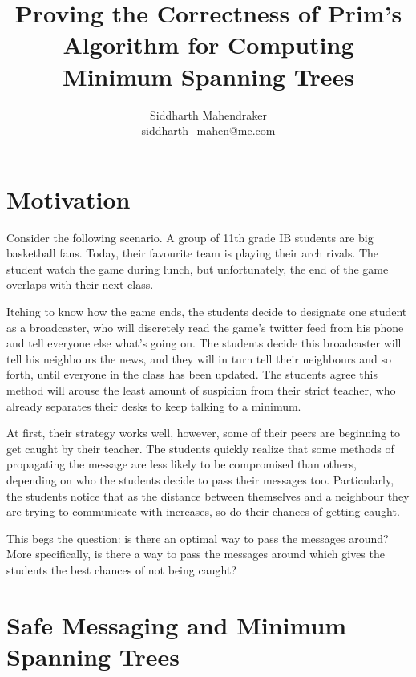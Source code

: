 \documentclass[a4paper,11pt]{report}
\theoremstyle{plain}
\theoremstyle{definition}
\begin{document}
\title{Proving the Correctness of Prim's Algorithm for Computing
Minimum Spanning Trees}
\author{Siddharth Mahendraker\\
    \url{siddharth\_mahen@me.com}}
\maketitle

\setcounter{page}{1}
\tableofcontents
\clearpage
\setcounter{page}{1}


\section{Motivation}

Consider the following scenario. A group of 11th grade IB students are big
basketball fans. Today, their favourite team is playing their arch rivals.
The student watch the game during lunch, but unfortunately, the end of the
game overlaps with their next class.

Itching to know how the game ends, the students decide to designate one
student as a broadcaster, who will discretely read the game's twitter
feed from his phone and tell everyone else what's going on. The students decide
this broadcaster will tell his neighbours the news, and they will in turn tell
their neighbours and so forth, until everyone in the class has been updated.
The students agree this method will arouse the least amount of suspicion from
their strict teacher, who already separates their desks to keep talking to
a minimum.

At first, their strategy works well, however, some of their peers are beginning
to get caught by their teacher. The students quickly realize
that some methods of propagating the message are less likely to be
compromised than others, depending on who the students decide to pass
their messages too. Particularly, the students notice that as the distance
between themselves and a neighbour they are trying to communicate with
increases, so do their chances of getting caught.

This begs the question: is there an optimal way to pass the messages around?
More specifically, is there a way to pass the messages around which gives
the students the best chances of not being caught?

\section{Safe Messaging and Minimum Spanning Trees}
\end{document}
